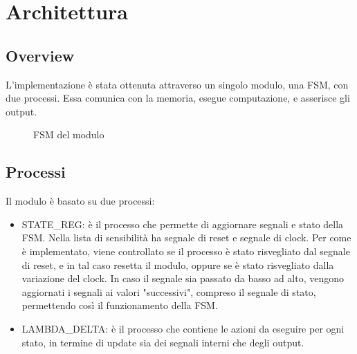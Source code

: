 \documentclass{article}
\begin{document}
\newpage
\section{Architettura}
\subsection{Overview}
L'implementazione è stata ottenuta attraverso un singolo modulo, una FSM, con due processi.
Essa comunica con la memoria, esegue computazione, e asserisce gli output.

\begin{figure}[ht]
    \centering
    \caption{FSM del modulo}
    \label{fig:my_label}
\end{figure}

\subsection{Processi}
Il modulo è basato su due processi:
\begin{itemize}
    \item STATE\_REG: è il processo che permette di aggiornare segnali e stato della FSM. Nella lista di sensibilità ha segnale di reset e segnale di clock. Per come è implementato, viene controllato se il processo è stato risvegliato dal segnale di reset, e in tal caso resetta il modulo, oppure se è stato risvegliato dalla variazione del clock.
    In caso il segnale sia passato da basso ad alto, vengono aggiornati i segnali ai valori "successivi", compreso il segnale di stato, permettendo così il funzionamento della FSM.
    \item LAMBDA\_DELTA: è il processo che contiene le azioni da eseguire per ogni stato, in termine di update sia dei segnali interni che degli output.
\end{itemize}
\end{document}

